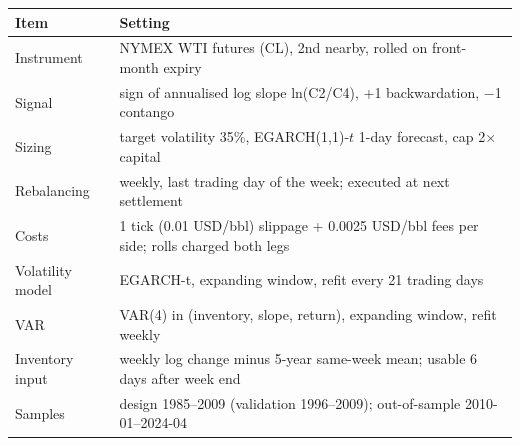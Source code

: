 \begin{tabular}{@{}p{}p{}@{}}
\toprule
Item & Setting \\
\midrule
Instrument & NYMEX WTI futures (CL), 2nd nearby, rolled on front-month expiry \\
Signal & sign of annualised log slope ln(C2/C4), +1 backwardation, $-$1 contango \\
Sizing & target volatility 35\%, EGARCH(1,1)-$t$ 1-day forecast, cap 2$\times$ capital \\
Rebalancing & weekly, last trading day of the week; executed at next settlement \\
Costs & 1 tick (0.01 USD/bbl) slippage + 0.0025 USD/bbl fees per side; rolls charged both legs \\
Volatility model & EGARCH-t, expanding window, refit every 21 trading days \\
VAR & VAR(4) in (inventory, slope, return), expanding window, refit weekly \\
Inventory input & weekly log change minus 5-year same-week mean; usable 6 days after week end \\
Samples & design 1985--2009 (validation 1996--2009); out-of-sample 2010-01--2024-04 \\
\bottomrule
\end{tabular}
